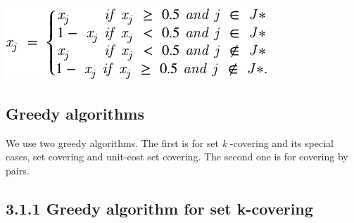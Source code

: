 \begin{multicols}{2}
\begin{center}
\includegraphics[width=\maxwidth{0.5\textwidth}]{mathml/math3.pdf}
\end{center}
\subsection*{Greedy algorithms}
\par{}We use two greedy algorithms.\allowbreak{} The first is for set \textit{k} -\allowbreak{}covering and its special cases,\allowbreak{} set covering and unit-\allowbreak{}cost set covering.\allowbreak{} The second one is for covering by pairs.\allowbreak{}\subsection*{3.\allowbreak{}1.\allowbreak{}1 Greedy algorithm for set k-\allowbreak{}covering}

\end{multicols}
